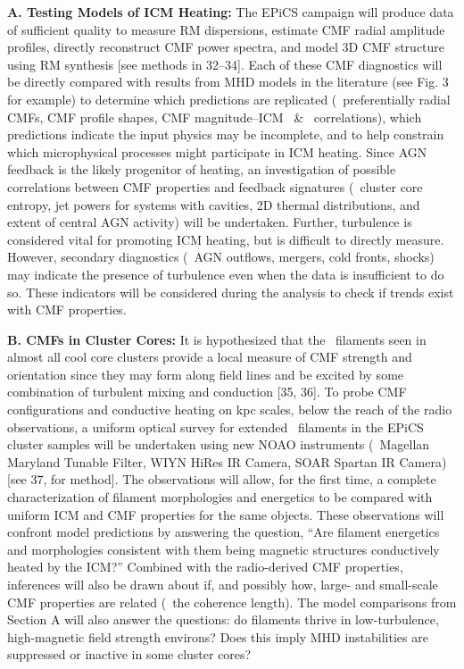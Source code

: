 \documentclass[letterpaper,12pt]{article}
\begin{document}
{\bf{A. Testing Models of ICM Heating:}} The EPiCS campaign will
produce data of sufficient quality to measure RM dispersions, estimate
CMF radial amplitude profiles, directly reconstruct CMF power spectra,
and model 3D CMF structure using RM synthesis [see methods in
  32--34]. Each of these CMF diagnostics will be directly compared
with results from MHD models in the literature (see Fig. 3 for
example) to determine which predictions are replicated
(\eg\ preferentially radial CMFs, CMF profile shapes, CMF
magnitude--ICM \nelec\ \& \tx\ correlations), which predictions
indicate the input physics may be incomplete, and to help constrain
which microphysical processes might participate in ICM heating. Since
AGN feedback is the likely progenitor of heating, an investigation of
possible correlations between CMF properties and feedback signatures
(\eg\ cluster core entropy, jet powers for systems with cavities, 2D
thermal distributions, and extent of central AGN activity) will be
undertaken. Further, turbulence is considered vital for promoting ICM
heating, but is difficult to directly measure. However, secondary
diagnostics (\eg\ AGN outflows, mergers, cold fronts, shocks) may
indicate the presence of turbulence even when the data is insufficient
to do so. These indicators will be considered during the analysis to
check if trends exist with CMF properties.

{\bf{B. CMFs in Cluster Cores:}} It is hypothesized that the
\halpha\ filaments seen in almost all cool core clusters provide a
local measure of CMF strength and orientation since they may form
along field lines and be excited by some combination of turbulent
mixing and conduction [35, 36]. To probe CMF configurations and
conductive heating on kpc scales, below the reach of the radio
observations, a uniform optical survey for extended \halpha\ filaments
in the EPiCS cluster samples will be undertaken using new NOAO
instruments (\ie\ Magellan Maryland Tunable Filter, WIYN HiRes IR
Camera, SOAR Spartan IR Camera) [see 37, for method]. The observations
will allow, for the first time, a complete characterization of
filament morphologies and energetics to be compared with uniform ICM
and CMF properties for the same objects. These observations will
confront model predictions by answering the question, ``Are filament
energetics and morphologies consistent with them being magnetic
structures conductively heated by the ICM?''  Combined with the
radio-derived CMF properties, inferences will also be drawn about if,
and possibly how, large- and small-scale CMF properties are related
(\eg\ the coherence length). The model comparisons from Section A will
also answer the questions: do filaments thrive in low-turbulence,
high-magnetic field strength environs? Does this imply MHD
instabilities are suppressed or inactive in some cluster cores?
\end{document}
